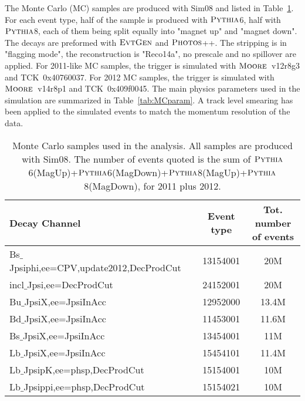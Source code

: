  The Monte Carlo (MC) samples are produced with Sim08 and listed in Table~\ref{tab:MC}. For each event type, half of the sample is produced with $\mbox{\textsc{Pythia}}$6, half with $\mbox{\textsc{Pythia}}$8, each of them being split equally into "magnet up" and "magnet down". The decays are preformed with $\mbox{\textsc{EvtGen}}$ and $\mbox{\textsc{Photos}}$++. The stripping is in "flagging mode", the reconstruction is "Reco14a", no prescale and no spillover are applied. For 2011-like MC samples, the trigger is simulated with $\mbox{\textsc{Moore}}$~v12r8g3 and TCK~0x40760037. For 2012 MC samples, the trigger is simulated with $\mbox{\textsc{Moore}}$~v14r8p1 and TCK~0x409f0045. The main physics parameters used in the simulation are summarized in Table~\ref{tab:MCparam}. A track level smearing has been applied to the simulated events to match the momentum resolution of the data.
   \begin{table}[hbt]
  \caption{
    Monte Carlo samples used in the analysis. All samples are produced with Sim08. The number of events quoted is the sum of $\mbox{\textsc{Pythia}}$6(MagUp)+$\mbox{\textsc{Pythia}}$6(MagDown)+$\mbox{\textsc{Pythia}}$8(MagUp)+$\mbox{\textsc{Pythia}}$8(MagDown), for 2011 plus 2012.}
    \small{
\begin{center}\begin{tabular}{lccc}
    \hline
    Decay Channel                         &  & Event type & Tot. number of events       \\ 
    \hline
    Bs$\_$Jpsiphi,ee=CPV,update2012,DecProdCut   &  & 13154001 &  20M\\
    incl$\_$Jpsi,ee=DecProdCut &  & 24152001  & 20M \\
    Bu$\_$JpsiX,ee=JpsiInAcc & &  12952000 & 13.4M \\
    Bd$\_$JpsiX,ee=JpsiInAcc & &  11453001 & 11.6M \\
    Bs$\_$JpsiX,ee=JpsiInAcc & &  13454001 & 11M \\
    Lb$\_$JpsiX,ee=JpsiInAcc & &  15454101 & 11.4M \\
    Lb$\_$JpsipK,ee=phsp,DecProdCut & &  15154001 & 10M \\
    Lb$\_$Jpsippi,ee=phsp,DecProdCut & &  15154021 & 10M \\
    \hline
  \end{tabular}\end{center}
  }
\label{tab:MC}
\end{table}

